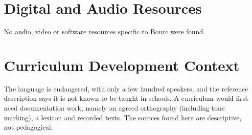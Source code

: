 \documentclass[12pt]{article}
\begin{document}
\section{Digital and Audio Resources}
No audio, video or software resources specific to Bouni were found.

\section{Curriculum Development Context}
The language is endangered, with only a few hundred speakers, and the reference description says it is not known to be taught in schools. A curriculum would first need documentation work, namely an agreed orthography (including tone marking), a lexicon and recorded texts. The sources found here are descriptive, not pedagogical.
\end{document}

